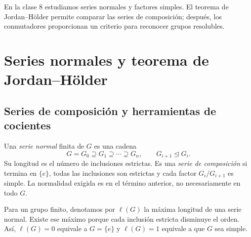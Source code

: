 En la clase 8 estudiamos series normales y factores simples. El teorema de Jordan--Hölder permite comparar las series de composición; después, los conmutadores proporcionan un criterio para reconocer grupos resolubles.

\section{Series normales y teorema de Jordan--Hölder}
\subsection{Series de composición y herramientas de cocientes}
\begin{defi}
Una \emph{serie normal} finita de $G$ es una cadena
\[
G=G_0\supseteq G_1\supseteq\cdots\supseteq G_n,
\qquad G_{i+1}\trianglelefteq G_i.
\]
Su longitud es el número de inclusiones estrictas. Es una \emph{serie de composición} si termina en $\{e\}$, todas las inclusiones son estrictas y cada factor $G_i/G_{i+1}$ es simple. La normalidad exigida es en el término anterior, no necesariamente en todo $G$.
\end{defi}
Para un grupo finito, denotamos por $\ell(G)$ la máxima longitud de una serie normal. Existe ese máximo porque cada inclusión estricta disminuye el orden. Así, $\ell(G)=0$ equivale a $G=\{e\}$ y $\ell(G)=1$ equivale a que $G$ sea simple.

